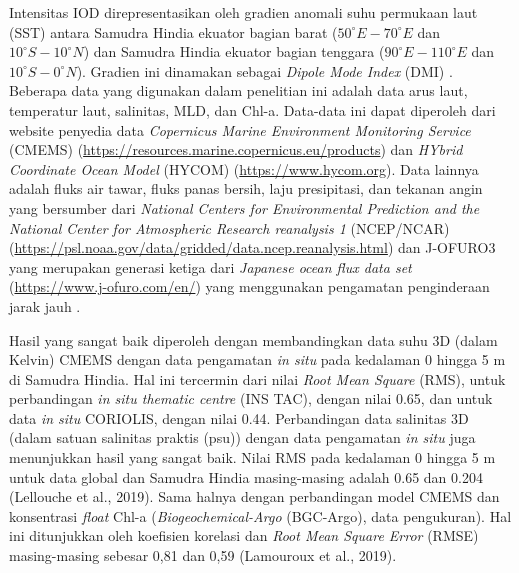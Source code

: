 \begin{spacing}{1.5}
	Intensitas IOD direpresentasikan oleh gradien anomali suhu permukaan laut (SST) antara Samudra Hindia ekuator bagian barat ($50^\circ E-70^\circ E$ dan $10^\circ S-10^\circ N$) dan Samudra Hindia ekuator bagian tenggara ($90^\circ E-110^\circ E$ dan $10^\circ S-0^\circ N$). Gradien ini dinamakan sebagai \textit{Dipole Mode Index} (DMI) \cite{Jiang2021,Dwivedi2012}. Beberapa data yang digunakan dalam penelitian ini adalah data arus laut, temperatur laut, salinitas, MLD, dan Chl-a. Data-data ini dapat diperoleh dari website penyedia data \textit{Copernicus Marine Environment Monitoring Service} (CMEMS) (\href{https://resources.marine.copernicus.eu/products}{https://resources.marine.copernicus.eu/products}) dan \textit{HYbrid Coordinate Ocean Model} (HYCOM) (\href{https://www.hycom.org}{https://www.hycom.org}). Data lainnya adalah fluks air tawar, fluks panas bersih, laju presipitasi, dan tekanan angin yang bersumber dari \textit{National Centers for Environmental Prediction and the National Center for Atmospheric Research reanalysis 1} (NCEP/NCAR) (\href{https://psl.noaa.gov/data/gridded/data.ncep.reanalysis.html}{https://psl.noaa.gov/data/gridded/data.ncep.reanalysis.html})  \cite{Kalnay1996} dan J-OFURO3 yang merupakan generasi ketiga dari \textit{Japanese ocean flux data set} (\href{https://www.j-ofuro.com/en/}{https://www.j-ofuro.com/en/}) yang menggunakan pengamatan penginderaan jarak jauh \cite{Tomita2019}. 
	
	Hasil yang sangat baik diperoleh dengan membandingkan data suhu 3D (dalam Kelvin) CMEMS dengan data pengamatan \textit{in situ} pada kedalaman 0 hingga 5 m di Samudra Hindia. Hal ini tercermin dari nilai \textit{Root Mean Square} (RMS), untuk perbandingan \textit{in situ thematic centre} (INS TAC), dengan nilai 0.65, dan untuk data \textit{in situ} CORIOLIS, dengan nilai 0.44. Perbandingan data salinitas 3D (dalam satuan salinitas praktis (psu)) dengan data pengamatan \textit{in situ} juga menunjukkan hasil yang sangat baik. Nilai RMS pada kedalaman 0 hingga 5 m untuk data global dan Samudra Hindia masing-masing adalah 0.65 dan 0.204 (Lellouche et al., 2019). Sama halnya dengan perbandingan model CMEMS dan konsentrasi \textit{float} Chl-a (\textit{Biogeochemical-Argo} (BGC-Argo), data pengukuran). Hal ini ditunjukkan oleh koefisien korelasi dan \textit{Root Mean Square Error} (RMSE) masing-masing sebesar 0,81 dan 0,59 (Lamouroux et al., 2019).   
	

\end{spacing}
